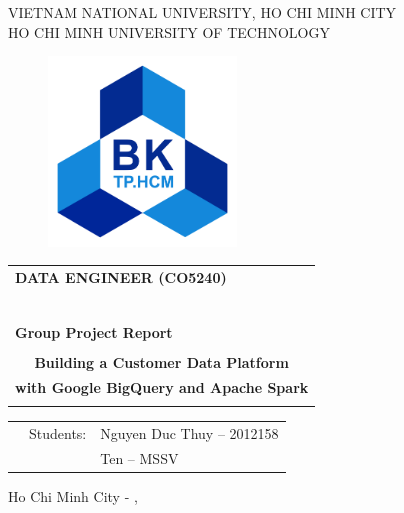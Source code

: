 \begin{titlepage}
\begin{center}
VIETNAM NATIONAL UNIVERSITY, HO CHI MINH CITY \\
HO CHI MINH UNIVERSITY OF TECHNOLOGY \\
\end{center}

\vspace{1cm}

\begin{figure}[h!]
\begin{center}
\includegraphics[width=5cm]{images/hcmut.png}
\end{center}
\end{figure}

\vspace{1cm}


\begin{center}
\begin{tabular}{c}
\multicolumn{1}{l}{\textbf{{\Large DATA ENGINEER (CO5240)}}}\\
~~\\
\hline
\\
\multicolumn{1}{l}{\textbf{{\Large Group Project Report}}}\\
\\
\textbf{{\Huge Building a Customer Data Platform}}\\
\textbf{{\Huge with Google BigQuery and Apache Spark}}\\
\\
\hline
\end{tabular}
\end{center}

\vspace{1.5cm}

\begin{table}[h]
\begin{tabular}{rrl}
\hspace{5 cm} & Students: & Nguyen Duc Thuy     -- 2012158 \\
              &           & Ten  -- MSSV


\end{tabular}
\end{table}
\vspace{1.5cm}
\begin{center}
{\footnotesize Ho Chi Minh City - \monthname[\the\month], \the\year}
\end{center}
\end{titlepage}
    